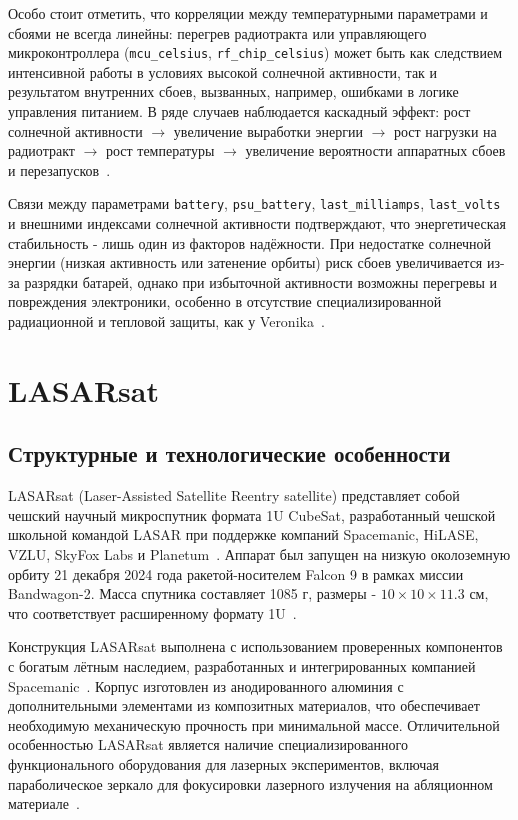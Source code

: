 Особо стоит отметить, что корреляции между температурными параметрами и сбоями
не всегда линейны: перегрев радиотракта или управляющего микроконтроллера
(\texttt{mcu\_celsius}, \texttt{rf\_chip\_celsius}) может быть как следствием
интенсивной работы в условиях высокой солнечной активности, так и результатом
внутренних сбоев, вызванных, например, ошибками в логике управления питанием. В
ряде случаев наблюдается каскадный эффект: рост солнечной активности
$\rightarrow$ увеличение выработки энергии $\rightarrow$ рост нагрузки на
радиотракт $\rightarrow$ рост температуры $\rightarrow$ увеличение вероятности
аппаратных сбоев и перезапусков~\cite{stehlikova_veronika, spacemanic_veronika}.

Связи между параметрами \texttt{battery}, \texttt{psu\_battery},
\texttt{last\_milliamps}, \texttt{last\_volts} и внешними индексами солнечной
активности подтверждают, что энергетическая стабильность - лишь один из факторов
надёжности. При недостатке солнечной энергии (низкая активность или затенение
орбиты) риск сбоев увеличивается из-за разрядки батарей, однако при избыточной
активности возможны перегревы и повреждения электроники, особенно в отсутствие
специализированной радиационной и тепловой защиты, как у
Veronika~\cite{spacemanic_veronika, stehlikova_veronika}.


\section{LASARsat}

\subsection{Структурные и технологические особенности}

LASARsat (Laser-Assisted Satellite Reentry satellite) представляет собой чешский
научный микроспутник формата 1U CubeSat, разработанный чешской школьной командой
LASAR при поддержке компаний Spacemanic, HiLASE, VZLU, SkyFox Labs и
Planetum~\cite{lasar_info, spacemanic_lasarsat, wiki_lasarsat}. Аппарат был
запущен на низкую околоземную орбиту 21 декабря 2024 года ракетой-носителем
Falcon 9 в рамках миссии Bandwagon-2. Масса спутника составляет 1085 г, размеры
- $10 \times 10 \times 11.3$ см, что соответствует расширенному формату
1U~\cite{wiki_lasarsat, spacemanic_lasarsat, satnogs_lasarsat}.

Конструкция LASARsat выполнена с использованием проверенных компонентов с
богатым лётным наследием, разработанных и интегрированных компанией
Spacemanic~\cite{spacemanic_lasarsat}. Корпус изготовлен из анодированного
алюминия с дополнительными элементами из композитных материалов, что
обеспечивает необходимую механическую прочность при минимальной массе.
Отличительной особенностью LASARsat является наличие специализированного
функционального оборудования для лазерных экспериментов, включая параболическое
зеркало для фокусировки лазерного излучения на абляционном
материале~\cite{satnogs_lasarsat, lasar_info}.

